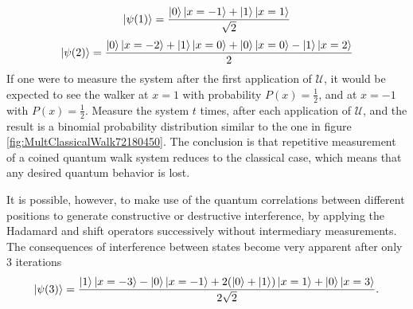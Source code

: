 \documentclass[../../dissertation.tex]{subfiles}
\begin{document}
\begin{equation}
	\ket{\psi(1)} = \frac{\ket{0}\ket{x=-1}+\ket{1}\ket{x=1}}{\sqrt{2}}
\end{equation}
\begin{equation}
	\ket{\psi(2)} = \frac{\ket{0}\ket{x=-2}+\ket{1}\ket{x=0}+\ket{0}\ket{x=0}-\ket{1}\ket{x=2}}{2}
\end{equation}
If one were to measure the system after the first application of $\mathcal{U}$,
it would be expected to see the walker at $x=1$ with probability $P(x) =
\frac{1}{2}$, and at $x=-1$ with $P(x) = \frac{1}{2}$. Measure the
system $t$ times, after each application of $\mathcal{U}$, and the result is a
binomial probability distribution similar to the one in figure
\ref{fig:MultClassicalWalk72180450}. The conclusion is that repetitive
measurement of a coined quantum walk system reduces to the classical case,
which means that any desired quantum behavior is lost. \par

It is possible, however, to make use of the quantum correlations between
different positions to generate constructive or destructive interference, by
applying the Hadamard and shift operators successively without intermediary
measurements.  The consequences of interference between states become very
apparent after only 3 iterations 
\begin{equation}
	\ket{\psi(3)} = \frac{\ket{1}\ket{x=-3}-\ket{0}\ket{x=-1}+2(\ket{0}+\ket{1})\ket{x=1}+\ket{0}\ket{x=3}}{2\sqrt{2}}\label{eq:12}.
\end{equation}
\end{document}
